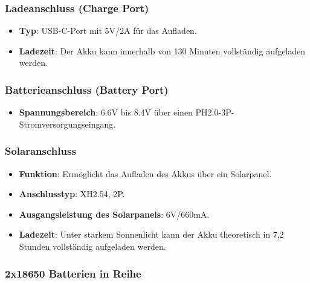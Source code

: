 \documentclass{vorlage-design-main}
\begin{document}
\hypertarget{ladeanschluss-charge-port}{%
\subsubsection{Ladeanschluss (Charge
Port)}\label{ladeanschluss-charge-port}}

\begin{itemize}

\item
  \textbf{Typ}: USB-C-Port mit 5V/2A für das Aufladen.
\item
  \textbf{Ladezeit}: Der Akku kann innerhalb von 130 Minuten vollständig
  aufgeladen werden.
\end{itemize}

\hypertarget{batterieanschluss-battery-port}{%
\subsubsection{Batterieanschluss (Battery
Port)}\label{batterieanschluss-battery-port}}

\begin{itemize}

\item
  \textbf{Spannungsbereich}: 6.6V bis 8.4V über einen
  PH2.0-3P-Stromversorgungseingang.
\end{itemize}

\hypertarget{solaranschluss}{%
\subsubsection{Solaranschluss}\label{solaranschluss}}

\begin{itemize}

\item
  \textbf{Funktion}: Ermöglicht das Aufladen des Akkus über ein
  Solarpanel.
\item
  \textbf{Anschlusstyp}: XH2.54, 2P.
\item
  \textbf{Ausgangsleistung des Solarpanels}: 6V/660mA.
\item
  \textbf{Ladezeit}: Unter starkem Sonnenlicht kann der Akku theoretisch
  in 7,2 Stunden vollständig aufgeladen werden.
\end{itemize}

\hypertarget{x18650-batterien-in-reihe}{%
\subsubsection{2x18650 Batterien in
Reihe}\label{x18650-batterien-in-reihe}}
\end{document}
